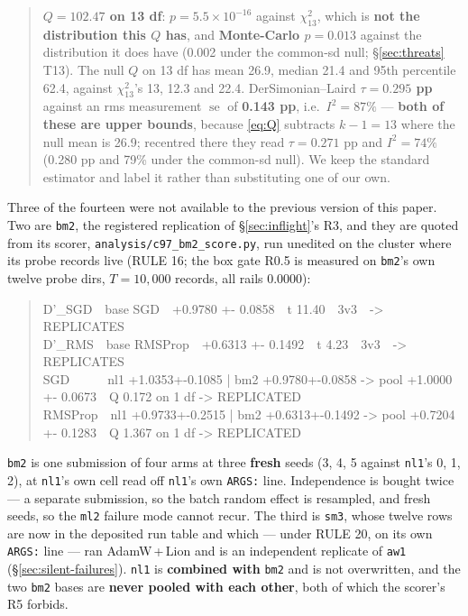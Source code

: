 \documentclass[10pt,letterpaper]{article}
\newcommand{\arm}[1]{\texttt{#1}}
\DeclareMathOperator{\se}{se}
\begin{document}
\begin{quote}
\textbf{$Q = 102.47$ on 13 df}: $p = 5.5\times10^{-16}$ against $\chi^2_{13}$, which is
\textbf{not the distribution this $Q$ has}, and \textbf{Monte-Carlo $p = 0.013$} against the
distribution it does have (0.002 under the common-sd null; \S\ref{sec:threats} T13). The null
$Q$ on 13 df has mean 26.9, median 21.4 and 95th percentile 62.4, against $\chi^2_{13}$'s 13,
12.3 and 22.4. DerSimonian--Laird \textbf{$\tau = 0.295$ pp} against an rms measurement $\se$
of \textbf{0.143 pp}, i.e.\ $I^2 = 87\%$ --- \textbf{both of these are upper bounds}, because
\eqref{eq:Q} subtracts $k - 1 = 13$ where the null mean is 26.9; recentred there they read
$\tau = 0.271$ pp and $I^2 = 74\%$ (0.280 pp and 79\% under the common-sd null). We keep the
standard estimator and label it rather than substituting one of our own.
\end{quote}

Three of the fourteen were not available to the previous version of this paper. Two are \arm{bm2}, the registered
replication of \S\ref{sec:inflight}'s R3, and they are quoted from its scorer,
\texttt{analysis/c97\_bm2\_score.py}, run unedited on the cluster where its probe records live
(RULE 16; the box gate R0.5 is measured on \arm{bm2}'s own twelve probe dirs, $T = 10{,}000$
records, all rails 0.0000):

\begin{quote}\ttfamily\footnotesize
D'\_SGD~~base SGD~~+0.9780 +- 0.0858~~t 11.40~~3v3~~-> REPLICATES\\
D'\_RMS~~base RMSProp~~+0.6313 +- 0.1492~~t 4.23~~3v3~~-> REPLICATES\\
SGD~~~~~~nl1 +1.0353+-0.1085 | bm2 +0.9780+-0.0858 -> pool +1.0000 +- 0.0673~~Q 0.172 on 1 df
-> REPLICATED\\
RMSProp~~nl1 +0.9733+-0.2515 | bm2 +0.6313+-0.1492 -> pool +0.7204 +- 0.1283~~Q 1.367 on 1 df
-> REPLICATED
\end{quote}

\arm{bm2} is one submission of four arms at three \textbf{fresh} seeds (3, 4, 5 against
\arm{nl1}'s 0, 1, 2), at \arm{nl1}'s own cell read off \arm{nl1}'s own \texttt{ARGS:} line.
Independence is bought twice --- a separate submission, so the batch random effect is resampled,
and fresh seeds, so the \arm{ml2} failure mode cannot recur. The third is \arm{sm3}, whose twelve
rows are now in the deposited run table and which --- under RULE 20, on its own \texttt{ARGS:}
line --- ran AdamW\,+\,Lion and is an independent replicate of \arm{aw1}
(\S\ref{sec:silent-failures}). \arm{nl1} is \textbf{combined with} \arm{bm2} and is not
overwritten, and the two \arm{bm2} bases are \textbf{never pooled with each other}, both of which
the scorer's R5 forbids.
\end{document}
